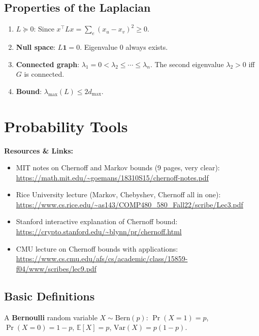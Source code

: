 \documentclass[12pt]{article}
\theoremstyle{definition}
\theoremstyle{remark}
\newcommand{\resources}[1]{%
  \vspace{4pt}
  \noindent\colorbox{blue!8}{\parbox{\dimexpr\linewidth-2\fboxsep}{%
    \small\textbf{Resources \& Links:} #1}}
  \vspace{4pt}
}
\begin{document}
\subsection{Properties of the Laplacian}

\begin{enumerate}
  \item \textbf{$L \succeq 0$}: Since $x^\top Lx = \sum_e(x_u-x_v)^2 \ge 0$.
  \item \textbf{Null space}: $L\mathbf{1} = 0$.  Eigenvalue 0 always exists.
  \item \textbf{Connected graph}: $\lambda_1 = 0 < \lambda_2 \le \cdots \le \lambda_n$.
        The second eigenvalue $\lambda_2 > 0$ iff $G$ is connected.
  \item \textbf{Bound}: $\lambda_{\max}(L) \le 2d_{\max}$.
\end{enumerate}

\section{Probability Tools}

\resources{
\begin{itemize}\setlength\itemsep{0pt}
  \item MIT notes on Chernoff and Markov bounds (9 pages, very clear):
        \url{https://math.mit.edu/~goemans/18310S15/chernoff-notes.pdf}
  \item Rice University lecture (Markov, Chebyshev, Chernoff all in one):
        \url{https://www.cs.rice.edu/~as143/COMP480_580_Fall22/scribe/Lec3.pdf}
  \item Stanford interactive explanation of Chernoff bound:
        \url{https://crypto.stanford.edu/~blynn/pr/chernoff.html}
  \item CMU lecture on Chernoff bounds with applications:
        \url{https://www.cs.cmu.edu/afs/cs/academic/class/15859-f04/www/scribes/lec9.pdf}
\end{itemize}
}

\subsection{Basic Definitions}

A \textbf{Bernoulli} random variable $X \sim \mathrm{Bern}(p)$:
$\Pr(X=1) = p$, $\Pr(X=0) = 1-p$, $\mathbb{E}[X] = p$, $\mathrm{Var}(X) = p(1-p)$.
\end{document}
